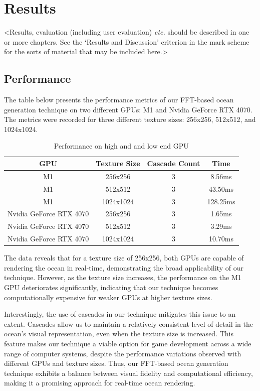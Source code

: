 \justifying
\chapter{Results}
\label{chapter3}

<Results, evaluation (including user evaluation) {\em etc.} should be described in one or more chapters. See the `Results and Discussion' criterion in the mark scheme for the sorts of material that may be included here.>
\section{Performance}

The table below presents the performance metrics of our FFT-based ocean generation technique on two different GPUs: M1 and Nvidia GeForce RTX 4070. The metrics were recorded for three different texture sizes: 256x256, 512x512, and 1024x1024.

\begin{table}[h]
    \centering
    \begin{tabular}{|c|c|c|c|}
        \hline
        \textbf{GPU} & \textbf{Texture Size} & \textbf{Cascade Count} & \textbf{Time} \\
        \hline
        M1 & 256x256 & 3 & 8.56ms \\
        \hline
        M1 & 512x512 & 3 & 43.50ms \\
        \hline
        M1 & 1024x1024 & 3 & 128.25ms \\
        \hline
        Nvidia GeForce RTX 4070 & 256x256 & 3 & 1.65ms \\
        \hline
        Nvidia GeForce RTX 4070 & 512x512 & 3 & 3.29ms \\
        \hline
        Nvidia GeForce RTX 4070 & 1024x1024 & 3 & 10.70ms \\
        \hline
    \end{tabular}
    \caption{Performance on high and and low end GPU}
    \label{tab:fft_performance}
\end{table}

The data reveals that for a texture size of 256x256, both GPUs are capable of rendering the ocean in real-time, demonstrating the broad applicability of our technique. However, as the texture size increases, the performance on the M1 GPU deteriorates significantly, indicating that our technique becomes computationally expensive for weaker GPUs at higher texture sizes.

Interestingly, the use of cascades in our technique mitigates this issue to an extent. Cascades allow us to maintain a relatively consistent level of detail in the ocean’s visual representation, even when the texture size is increased. This feature makes our technique a viable option for game development across a wide range of computer systems, despite the performance variations observed with different GPUs and texture sizes. Thus, our FFT-based ocean generation technique exhibits a balance between visual fidelity and computational efficiency, making it a promising approach for real-time ocean rendering.

